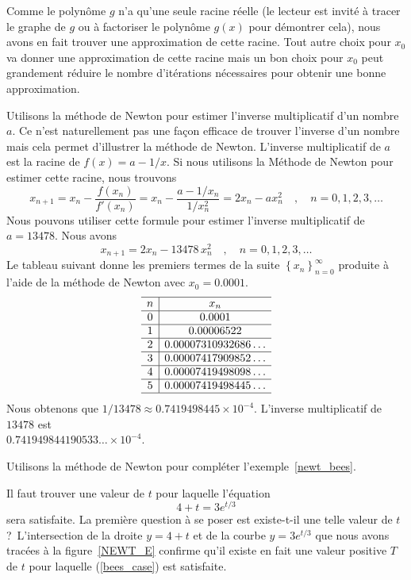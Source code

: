 {\begin{egg}
Comme le polynôme $g$ n'a qu'une seule racine réelle (le lecteur est
invité à tracer le graphe de $g$ ou à factoriser le polynôme $g(x)$
pour démontrer cela), nous avons en fait trouver une approximation de cette
racine.  Tout autre choix pour $x_0$ va donner une approximation de
cette racine mais un bon choix pour $x_0$ peut grandement réduire le
nombre d'itérations nécessaires pour obtenir une bonne approximation.
\end{egg}

\begin{egg}[\eng]
Utilisons la méthode de Newton pour estimer l'inverse
multiplicatif d'un nombre $a$.  Ce n'est naturellement pas une façon
efficace de trouver l'inverse d'un nombre mais cela permet d'illustrer
la méthode de Newton. L'inverse multiplicatif de $a$ est la racine de
$f(x) = a - 1/x$.  Si nous utilisons la Méthode de Newton pour estimer
cette racine, nous trouvons
\[
x_{n+1} = x_n - \frac{f(x_n)}{f'(x_n)}
= x_n - \frac{a - 1/x_n}{1/x_n^2} = 2x_n - a x_n^2 \quad , \quad
n=0,1,2,3,\ldots
\]
Nous pouvons utiliser cette formule pour estimer l'inverse multiplicatif de
$a = 13478$.  Nous avons
\[
x_{n+1} = 2 x_n - 13478\, x_n^2 \quad , \quad n=0,1,2,3,\ldots
\]
Le tableau suivant donne les premiers termes de la suite
$\displaystyle \left\{x_n\right\}_{n=0}^\infty$ produite à l'aide de la
méthode de Newton avec $x_0 = 0.0001$.
\[
\begin{array}{c|c}
\hline
n & x_n \\ \hline
0 & 0.0001 \\ \hline
1 & 0.00006522 \\ \hline
2 & 0.00007310932686\ldots \\ \hline
3 & 0.00007417909852\ldots  \\ \hline
4 & 0.00007419498098\ldots \\ \hline
5 & 0.00007419498445\ldots \\ \hline
\end{array}
\]
Nous obtenons que $1/13478 \approx 0.7419498445 \times 10^{-4}$.  L'inverse
multiplicatif de $13478$ est\\
$0.741949844190533\ldots \times 10^{-4}$. 
\end{egg}

\begin{egg}[\life]
Utilisons la méthode de Newton pour compléter
l'exemple~\ref{newt_bees}.

Il faut trouver une valeur de $t$ pour laquelle l'équation
\begin{equation} \label{bees_case}
4 + t = 3 e^{t/3}
\end{equation}
sera satisfaite.  La première question à se poser est \lgm existe-t-il
une telle valeur de $t$?\rgm\  L'intersection de la droite $y= 4+ t$
et de la courbe $y = 3 e^{t/3}$ que nous avons tracées à la
figure~\ref{NEWT_E} confirme qu'il existe en fait une valeur positive
$T$ de $t$ pour laquelle (\ref{bees_case}) est satisfaite.


\end{egg}}
